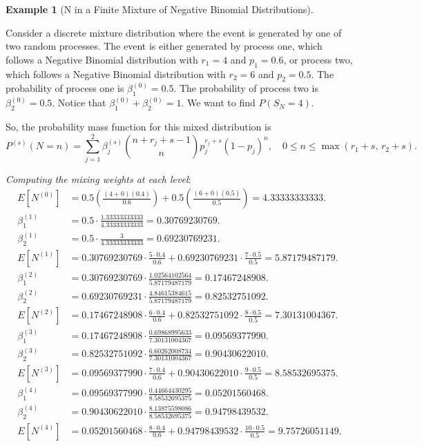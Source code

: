 \documentclass[11pt]{amsart}
\theoremstyle{definition}
\newtheorem{example}{Example}
\theoremstyle{plain}
\begin{document}
\begin{example}[N in a Finite Mixture of Negative Binomial Distributions]
\label{ex:negbin-mix}
Consider a discrete mixture distribution where the event is generated by one of two random
processes.  The event is either generated by process one, which follows a Negative Binomial
distribution with $r_1 = 4$ and $p_1 = 0.6$, or process two, which follows a Negative
Binomial distribution with $r_2 = 6$ and $p_2 = 0.5$.  The probability of process one is
$\beta_1^{(0)} = 0.5$.  The probability of process two is $\beta_2^{(0)} = 0.5$.  Notice
that $\beta_1^{(0)} + \beta_2^{(0)} = 1$.  We want to find $P(S_N = 4)$.

So, the probability mass function for this mixed distribution is
\[
    P^{(s)}(N = n)
    = \sum_{j=1}^{2}\beta_j^{(s)}
      \binom{n + r_j + s - 1}{n} p_j^{r_j+s}(1-p_j)^n,
    \quad 0 \leq n \leq \max(r_1 + s,\, r_2 + s).
\]

\noindent\textit{Computing the mixing weights at each level}:
\begin{align*}
E[N^{(0)}]
    &= 0.5\left(\frac{(4+0)(0.4)}{0.6}\right) + 0.5\left(\frac{(6+0)(0.5)}{0.5}\right)
     = 4.33333333333. \\
\beta_1^{(1)} &= 0.5 \cdot \frac{1.33333333333}{4.33333333333} = 0.30769230769. \\
\beta_2^{(1)} &= 0.5 \cdot \frac{3}{4.33333333333} = 0.69230769231. \\
E[N^{(1)}]
    &= 0.30769230769 \cdot \frac{5 \cdot 0.4}{0.6}
     + 0.69230769231 \cdot \frac{7 \cdot 0.5}{0.5}
     = 5.87179487179. \\
\beta_1^{(2)} &= 0.30769230769 \cdot
    \frac{1.02564102564}{5.87179487179} = 0.17467248908. \\
\beta_2^{(2)} &= 0.69230769231 \cdot
    \frac{4.84615384615}{5.87179487179} = 0.82532751092. \\
E[N^{(2)}]
    &= 0.17467248908 \cdot \frac{6 \cdot 0.4}{0.6}
     + 0.82532751092 \cdot \frac{8 \cdot 0.5}{0.5}
     = 7.30131004367. \\
\beta_1^{(3)} &= 0.17467248908 \cdot
    \frac{0.69868995633}{7.30131004367} = 0.09569377990. \\
\beta_2^{(3)} &= 0.82532751092 \cdot
    \frac{6.60262008734}{7.30131004367} = 0.90430622010. \\
E[N^{(3)}]
    &= 0.09569377990 \cdot \frac{7 \cdot 0.4}{0.6}
     + 0.90430622010 \cdot \frac{9 \cdot 0.5}{0.5}
     = 8.58532695375. \\
\beta_1^{(4)} &= 0.09569377990 \cdot
    \frac{0.44664430295}{8.58532695375} = 0.05201560468. \\
\beta_2^{(4)} &= 0.90430622010 \cdot
    \frac{8.13875598086}{8.58532695375} = 0.94798439532. \\
E[N^{(4)}]
    &= 0.05201560468 \cdot \frac{8 \cdot 0.4}{0.6}
     + 0.94798439532 \cdot \frac{10 \cdot 0.5}{0.5}
     = 9.75726051149.
\end{align*}


\end{example}
\end{document}
